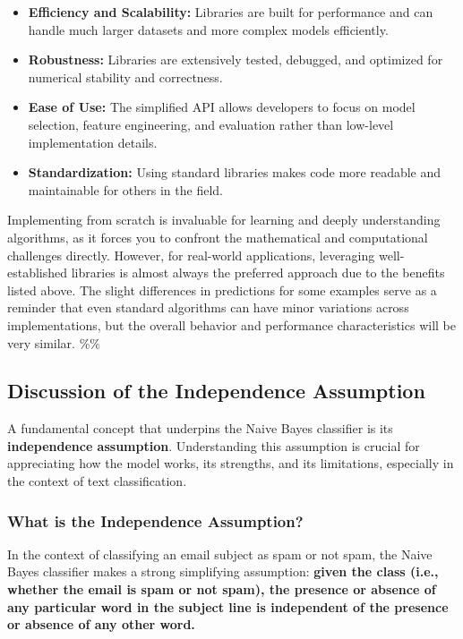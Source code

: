 \documentclass[12pt,a4paper]{article}
\begin{document}
\begin{itemize}
    \item \textbf{Efficiency and Scalability:} Libraries are built for performance and can handle much larger datasets and more complex models efficiently.
    \item \textbf{Robustness:} Libraries are extensively tested, debugged, and optimized for numerical stability and correctness.
    \item \textbf{Ease of Use:} The simplified API allows developers to focus on model selection, feature engineering, and evaluation rather than low-level implementation details.
    \item \textbf{Standardization:} Using standard libraries makes code more readable and maintainable for others in the field.
\end{itemize}

Implementing from scratch is invaluable for learning and deeply understanding algorithms, as it forces you to confront the mathematical and computational challenges directly. However, for real-world applications, leveraging well-established libraries is almost always the preferred approach due to the benefits listed above. The slight differences in predictions for some examples serve as a reminder that even standard algorithms can have minor variations across implementations, but the overall behavior and performance characteristics will be very similar.
\%\%


\subsection{Discussion of the Independence Assumption}

A fundamental concept that underpins the Naive Bayes classifier is its \textbf{independence assumption}. Understanding this assumption is crucial for appreciating how the model works, its strengths, and its limitations, especially in the context of text classification.

\subsubsection{What is the Independence Assumption?}

In the context of classifying an email subject as spam or not spam, the Naive Bayes classifier makes a strong simplifying assumption: \textbf{given the class (i.e., whether the email is spam or not spam), the presence or absence of any particular word in the subject line is independent of the presence or absence of any other word.}
\end{document}
